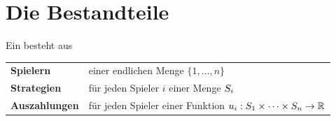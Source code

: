 \section{Die Bestandteile}

\begin{definition}
Ein  besteht aus
\begin{center}
{\small
\renewcommand{\arraystretch}{1.5}
\begin{tabular}{@{}P{2.4cm}P{6.2cm}@{}}
\toprule
\textbf{Spielern} & einer endlichen Menge $\{1,\ldots,n\}$\\
\textbf{Strategien} & für jeden Spieler $i$ einer Menge $S_i$\\
\textbf{Auszahlungen} & für jeden Spieler einer Funktion $u_i: S_1\times\cdots\times S_n \to \mathbb{R}$\\
\bottomrule
\end{tabular}}
\end{center}
\end{definition}

